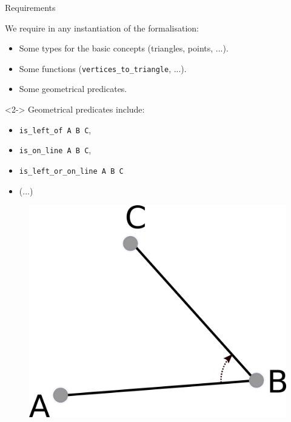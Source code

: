 \documentclass[18pt]{beamer}
\begin{document}
\begin{frame}{Requirements}
 
 We require in any instantiation of the formalisation:
 \begin{itemize}
  \item Some types for the basic concepts (triangles, points, ...).
  \item Some functions ({\tt vertices\_to\_triangle}, ...).
  \item Some geometrical predicates.
 \end{itemize}
 \begin{uncoverenv}<2->
 Geometrical predicates include:
 \end{uncoverenv}
\vspace{0.15cm}

\begin{minipage}{.6\textwidth}
 \begin{itemize}
  \item<2-> {\tt is\_left\_of A B C},
  \item<3-> {\tt is\_on\_line A B C},
  \item<4-> {\tt is\_left\_or\_on\_line A B C}
  \item<5-> (...)
  \end{itemize}
\end{minipage}%
\begin{minipage}{.4\textwidth}
  \begin{overprint}
     \begin{figure}
   \centering
  \includegraphics[scale=1.3]{isleftof}
 \end{figure}  
 

\end{overprint}
\end{minipage}
\end{frame}
\end{document}
